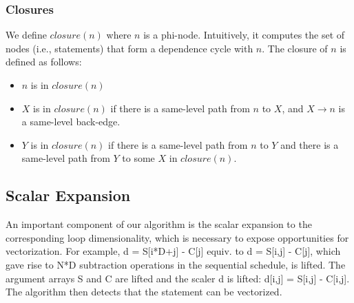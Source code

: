 \subsubsection{Closures}

We define $\mathit{closure}(n)$ where $n$ is a phi-node. Intuitively, it computes the set of nodes (i.e., statements) that form a dependence cycle with $n$. The closure of $n$ is defined as follows:
\begin{itemize}
\item $n$ is in $\mathit{closure}(n)$
\item $X$ is in $\mathit{closure}(n)$ if there is a same-level path from $n$ to $X$, and $X \rightarrow n$ is a same-level back-edge.
\item $Y$ is in $\mathit{closure}(n)$ if there is a same-level path from $n$ to $Y$ and there is a same-level path from $Y$ to some $X$ in $\mathit{closure}(n)$.
\end{itemize}

\subsection{Scalar Expansion}


An important component of our algorithm is the scalar expansion to the corresponding loop dimensionality, 
which is necessary to expose opportunities for vectorization.
For example, {\sf d = S[i*D+j] - C[j]} equiv. to {\sf d = S[i,j] - C[j]}, which gave rise to {\sf N*D} subtraction operations in the sequential schedule,
is lifted. The argument arrays {\sf S} and {\sf C} are lifted and the scaler {\sf d} is lifted: {\sf d[i,j] = S[i,j] - C[i,j]}.
The algorithm then detects that the statement can be vectorized.

